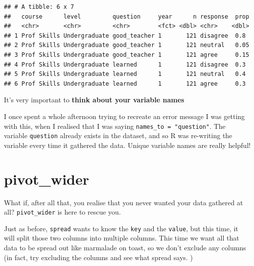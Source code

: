 \documentclass[
]{book}
\newenvironment{Shaded}{\begin{snugshade}}{\end{snugshade}}
\newcommand{\DataTypeTok}[1]{\textcolor[rgb]{0.13,0.29,0.53}{#1}}
\newcommand{\KeywordTok}[1]{\textcolor[rgb]{0.13,0.29,0.53}{\textbf{#1}}}
\newcommand{\NormalTok}[1]{#1}
\newcommand{\OperatorTok}[1]{\textcolor[rgb]{0.81,0.36,0.00}{\textbf{#1}}}
\newcommand{\StringTok}[1]{\textcolor[rgb]{0.31,0.60,0.02}{#1}}
\begin{document}
\begin{verbatim}
## # A tibble: 6 x 7
##   course      level         question     year      n response  prop
##   <chr>       <chr>         <chr>        <fct> <dbl> <chr>    <dbl>
## 1 Prof Skills Undergraduate good_teacher 1       121 disagree  0.8 
## 2 Prof Skills Undergraduate good_teacher 1       121 neutral   0.05
## 3 Prof Skills Undergraduate good_teacher 1       121 agree     0.15
## 4 Prof Skills Undergraduate learned      1       121 disagree  0.3 
## 5 Prof Skills Undergraduate learned      1       121 neutral   0.4 
## 6 Prof Skills Undergraduate learned      1       121 agree     0.3
\end{verbatim}

\begin{hey}
It's very important to \textbf{think about your variable names}

I once spent a whole afternoon trying to recreate an error message I was
getting with this, when I realised that I was saying
\texttt{names\_to\ =\ "question"}. The variable \texttt{question}
already exists in the dataset, and so R was re-writing the variable
every time it gathered the data. Unique variable names are really
helpful!
\end{hey}

\hypertarget{pivot_wider}{%
\section{pivot\_wider}\label{pivot_wider}}

What if, after all that, you realise that you never wanted your data gathered at all? \texttt{pivot\_wider} is here to rescue you.

Just as before, \texttt{spread} wants to know the \texttt{key} and the \texttt{value}, but this time, it will split those two columns into multiple columns. This time we want all that data to be spread out like marmalade on toast, so we don't exclude any columns (in fact, try excluding the columns and see what spread says. )

\begin{Shaded}
\end{Shaded}
\end{document}
